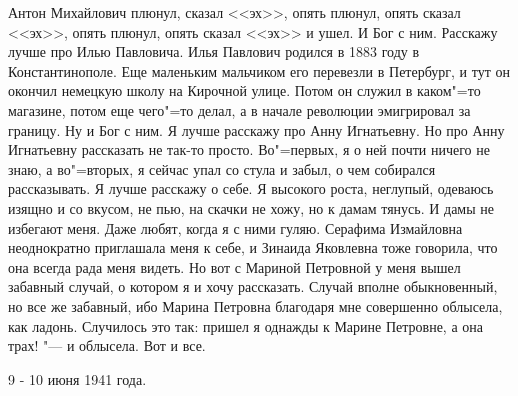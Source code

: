     Антон Михайлович плюнул, сказал <<эх>>, опять плюнул, опять сказал <<эх>>,
	опять плюнул, опять сказал <<эх>> и ушел. И Бог с ним. Расскажу лучше про
	Илью Павловича. Илья Павлович родился в 1883 году в Константинополе. Еще
	маленьким мальчиком его перевезли в Петербург, и тут он окончил немецкую
	школу на Кирочной улице. Потом он служил в каком"=то магазине, потом еще
	чего"=то делал, а в начале революции эмигрировал за границу. Ну и Бог с
	ним. Я лучше расскажу про Анну Игнатьевну. Но про Анну Игнатьевну
	рассказать не так-то просто. Во"=первых, я о ней почти ничего не знаю, а
	во"=вторых, я сейчас упал со стула и забыл, о чем собирался рассказывать.
	Я лучше расскажу о себе. Я высокого роста, неглупый, одеваюсь изящно и со
	вкусом, не пью, на скачки не хожу, но к дамам тянусь. И дамы не избегают
	меня. Даже любят, когда я с ними гуляю. Серафима Измайловна неоднократно
	приглашала меня к себе, и Зинаида Яковлевна тоже говорила, что она всегда
	рада меня видеть. Но вот с Мариной Петровной у меня вышел забавный случай,
	о котором я и хочу рассказать. Случай вполне обыкновенный, но все же
	забавный, ибо Марина Петровна благодаря мне совершенно облысела, как
	ладонь. Случилось это так: пришел я однажды к Марине Петровне, а она
	трах! "--- и облысела. Вот и все.

	\begin{flushright}
		9 - 10 июня 1941 года.
	\end{flushright}